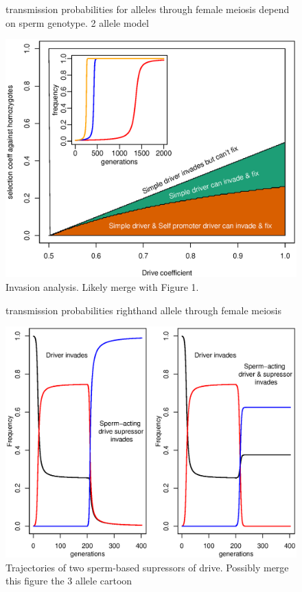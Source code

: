 \documentclass[12pt,letterpaper]{article}
\begin{document}
\begin{figure}
\caption{transmission probabilities for alleles through female
  meiosis depend on sperm genotype. 2 allele model}  
\label{Eggsperm_2_allele_cartoon}
\end{figure}

\begin{figure}
\includegraphics[width = 0.8 \textwidth]{Figures/invasion_space_recessive_driver.eps}
\caption{Invasion analysis. Likely merge with Figure 1.} \label{Invasion_space}
\end{figure}


\begin{figure}
\caption{transmission probabilities righthand allele through female
  meiosis}  \label{Eggsperm_3_allele_cartoon}
\end{figure}

\begin{figure}
\includegraphics[width = 0.8 \textwidth]{Figures/trajectories_of_sperm_based_supressors.eps} 
\caption{Trajectories of two sperm-based supressors of drive. Possibly
merge this figure the 3 allele cartoon}  \label{Trajectories_of_supressors}
\end{figure}
\end{document}
